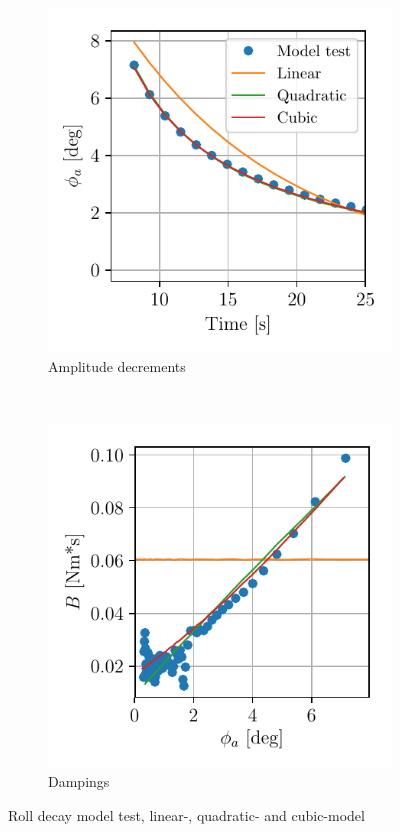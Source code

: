 \begin{figure}[!htb]
    \begin{subfigure}[b]{0.45\textwidth}
        \centering
        \includegraphics[]{kappa/images/roll_decay_amplitude.pdf}
        \caption{Amplitude decrements}
        \label{fig:roll_decay_amplitude}
    \end{subfigure}
        ~ %
    \begin{subfigure}[b]{0.45\textwidth}
        \centering
        \includegraphics[]{kappa/images//roll_decay_damping.pdf}
        \caption{Dampings}
        \label{fig:roll_decay_damping}
    \end{subfigure}
    \caption{Roll decay model test, linear-, quadratic- and cubic-model}
    \label{fig:roll_decay}
\end{figure}

